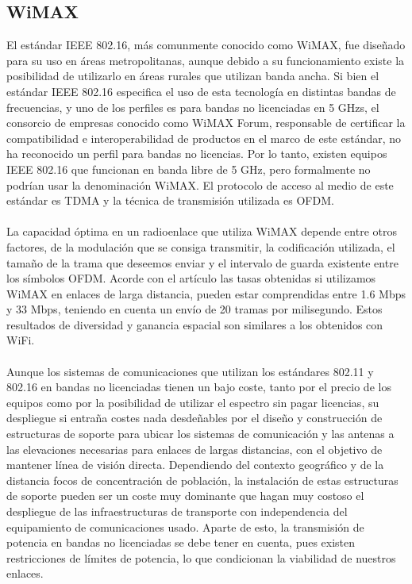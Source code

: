 		
\subsection{WiMAX}
El estándar IEEE 802.16, más comunmente conocido como WiMAX, fue diseñado para su uso en áreas metropolitanas, aunque debido a su funcionamiento existe la posibilidad de utilizarlo en áreas rurales que utilizan banda ancha. Si bien el estándar IEEE 802.16 especifica el uso de esta tecnología en distintas bandas de frecuencias, y uno de los perfiles es para bandas no licenciadas en 5 GHzs, el consorcio de empresas conocido como WiMAX Forum, responsable de certificar la compatibilidad e interoperabilidad de productos en el marco de este estándar, no ha reconocido un perfil para bandas no licencias. Por lo tanto, existen equipos IEEE 802.16 que funcionan en banda libre de 5 GHz, pero formalmente no podrían usar la denominación WiMAX. El protocolo de acceso al medio de este estándar es TDMA y la técnica de transmisión utilizada es OFDM.\\\\

La capacidad óptima en un radioenlace que utiliza WiMAX depende entre otros factores, de la modulación que se consiga transmitir, la codificación utilizada, el tamaño de la trama que deseemos enviar y el intervalo de guarda existente entre los símbolos OFDM. Acorde con el artículo \cite{simo2014assessing} las tasas obtenidas si utilizamos WiMAX en enlaces de larga distancia, pueden estar comprendidas entre 1.6 Mbps y 33 Mbps, teniendo en cuenta un envío de 20 tramas por milisegundo. Estos resultados de diversidad y ganancia espacial son similares a los obtenidos con WiFi. \\\\
		
Aunque los sistemas de comunicaciones que utilizan los estándares 802.11 y 802.16 en bandas no licenciadas tienen un bajo coste, tanto por el precio de los equipos como por la posibilidad de utilizar el espectro sin pagar licencias, su despliegue si entraña costes nada desdeñables por el diseño y construcción de estructuras de soporte para ubicar los sistemas de comunicación y las antenas a las elevaciones necesarias para enlaces de largas distancias, con el objetivo de mantener línea de visión directa. Dependiendo del contexto geográfico y de la distancia focos de concentración de población, la instalación de estas estructuras de soporte pueden ser un coste muy dominante que hagan muy costoso el despliegue de las infraestructuras de transporte con independencia del equipamiento de comunicaciones usado. Aparte de esto, la transmisión de potencia en bandas no licenciadas se debe tener en cuenta, pues existen restricciones de límites de potencia, lo que condicionan la viabilidad de nuestros enlaces.

